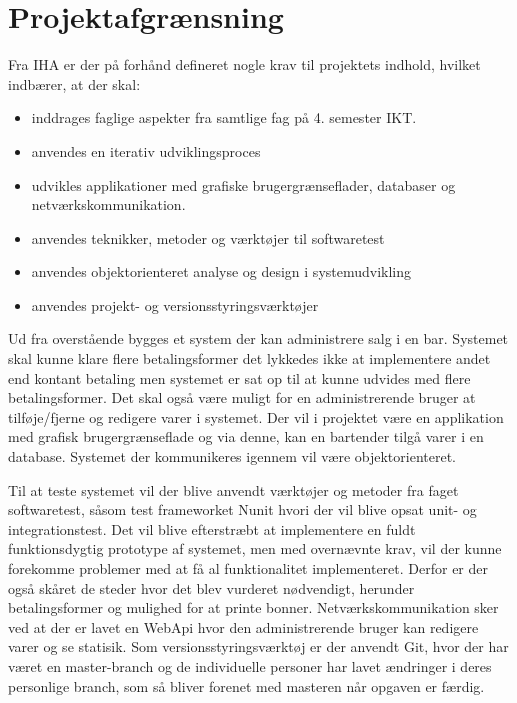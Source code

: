\chapter{Projektafgrænsning}
Fra IHA  er der på forhånd defineret nogle krav til projektets indhold, hvilket indbærer, at der skal:
\begin{itemize}
\item inddrages faglige aspekter fra samtlige fag på 4. semester IKT. 
\item anvendes en iterativ udviklingsproces
\item udvikles applikationer med grafiske brugergrænseflader, databaser og
netværkskommunikation.
\item anvendes teknikker, metoder og værktøjer til softwaretest
\item anvendes objektorienteret analyse og design i systemudvikling
\item anvendes projekt- og versionsstyringsværktøjer
\newline\newline
\end{itemize}

Ud fra overstående bygges et system der kan administrere salg i en bar. 
Systemet skal kunne klare flere betalingsformer det lykkedes ikke at implementere andet end kontant betaling men systemet er sat op til at kunne udvides med flere betalingsformer. 
Det skal også være muligt for en administrerende bruger at tilføje/fjerne og redigere varer i systemet.  
\newline\newline
Der vil i projektet være en applikation med grafisk brugergrænseflade og via denne, kan en bartender tilgå varer i en database. Systemet der kommunikeres igennem vil være objektorienteret. 

Til at teste systemet vil der blive anvendt værktøjer og metoder fra faget softwaretest, såsom test frameworket Nunit hvori der vil blive opsat unit- og integrationstest. 
\newline\newline
Det vil blive efterstræbt at implementere en fuldt funktionsdygtig prototype af systemet, 
men med overnævnte krav, vil der kunne forekomme problemer med at få al funktionalitet implementeret. 
Derfor er der også skåret de steder hvor det blev vurderet nødvendigt, herunder betalingsformer og mulighed for at printe bonner.
\newline\newline
Netværkskommunikation sker ved at der er lavet en WebApi hvor den administrerende bruger kan redigere varer og se statisik.  
\newline\newline
Som versionsstyringsværktøj er der anvendt Git, hvor der har været en master-branch og de individuelle personer har lavet ændringer i deres personlige branch, som så bliver forenet med masteren når opgaven er færdig.  
